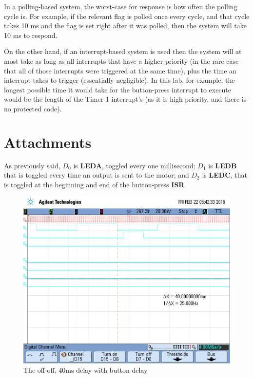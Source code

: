 \documentclass[a4paper, 12pt]{article}
\begin{document}
In a polling-based system, the worst-case for response is how often the polling cycle is. For example, if the relevant flag is polled once every cycle, and that cycle takes 10 ms and the flag is set right after it was polled, then the system will take 10 ms to respond.

On the other hand, if an interrupt-based system is used then the system will at most take as long as all interrupts that have a higher priority (in the rare case that all of those interrupts were triggered at the same time), plus the time an interrupt takes to trigger (essentially negligible). In this lab, for example, the longest possible time it would take for the button-press interrupt to execute would be the length of the Timer 1 interrupt's (as it is high priority, and there is no protected code).

\section{Attachments}
As previously said, $D_0$ is \textbf{LEDA}, toggled every one millisecond; $D_1$ is \textbf{LEDB} that is toggled every time an output is sent to the motor; and $D_2$ is \textbf{LEDC}, that is toggled at the beginning and end of the button-press \textbf{ISR}

\begin{figure}[htb]
\centering
\includegraphics[width=.8\textwidth]{00.png}
\caption{The off-off, 40ms delay with button delay}
\end{figure}
\end{document}
